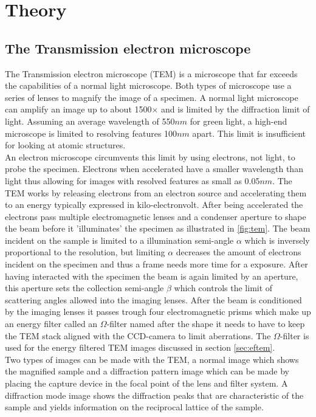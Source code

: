 \section{Theory}
\label{chap:theory}
\subsection{The Transmission electron microscope}
The Transmission electron microscope (TEM) is a microscope that far exceeds the capabilities of a normal light microscope. Both types of microscope use a series of lenses to magnify the image of a specimen.
A normal light microscope can amplify an image up to about 1500$\times$ and is limited by the diffraction limit of light. Assuming an average wavelength of 550$nm$ for green light, a high-end microscope is limited to resolving features 100$nm$ apart.
This limit is insufficient for looking at atomic structures.\cite{PhysRevLett.106.193905}\\
An electron microscope circumvents this limit by using electrons, not light, to probe the specimen. Electrons when accelerated have a smaller wavelength than light thus allowing for images with resolved features as small as 0.05$nm$. \cite{kisielowski_freitag_bischoff_van}
The TEM works by releasing electrons from an electron source and accelerating them to an energy typically expressed in kilo-electronvolt. After being accelerated the electrons pass multiple electromagnetic lenses and a condenser aperture to shape the beam before it 'illuminates' the specimen as illustrated in \ref{fig:tem}.
The beam incident on the sample is limited to a illumination semi-angle $\alpha$ which is inversely proportional to the resolution, but limiting $\alpha$ decreases the amount of electrons incident on the specimen and thus a frame needs more time for a exposure.
After having interacted with the specimen the beam is again limited by an aperture, this aperture sets the collection semi-angle $\beta$ which controls the limit of scattering angles allowed into the imaging lenses.
After the beam is conditioned by the imaging lenses it passes trough four electromagnetic prisms which make up an energy filter called an $\Omega$-filter named after the shape it needs to have to keep the TEM stack aligned with the CCD-camera to limit aberrations.
The $\Omega$-filter is used for the energy filtered TEM images discussed in section \ref{sec:eftem}.\\
Two types of images can be made with the TEM, a normal image which shows the magnified sample and a diffraction pattern image which can be made by placing the capture device in the focal point of the lens and filter system.
A diffraction mode image shows the diffraction peaks that are characteristic of the sample and yields information on the reciprocal lattice of the sample. \cite{Egerton_2008}


